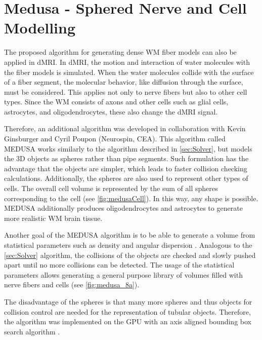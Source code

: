 \section{Medusa - Sphered Nerve and Cell Modelling}
\label{sec:medusa}
%
The proposed algorithm for generating dense \ac{WM} fiber models can also be applied in \ac{dMRI}.
In \ac{dMRI}, the motion and interaction of water molecules with the fiber models is simulated.
When the water molecules collide with the surface of a fiber segment, the molecular behavior, like diffusion through the surface, must be considered.
This applies not only to nerve fibers but also to other cell types.
Since the WM consists of axons and other cells such as glial cells, astrocytes, and oligodendrocytes, these also change the \ac{dMRI} signal.
\par
% 
Therefore, an additional algorithm was developed in collaboration with Kevin Ginsburger and Cyril Poupon (Neurospin, \ac{CEA}).
This algorithm called \ac{MEDUSA} \cite{Ginsburger2019} works similarly to the algorithm described in \cref{sec:Solver}, but models the 3D objects as spheres rather than pipe segments.
Such formulation has the advantage that the objects are simpler,
which leads to faster collision checking calculations.
Additionally, the spheres are also used to represent other types of cells.
The overall cell volume is represented by the sum of all spheres corresponding to the cell (see \cref{fig:medusaCell}).
In this way, any shape is possible.
\ac{MEDUSA} additionally produces oligodendrocytes and astrocytes to generate more realistic \ac{WM} brain tissue.
\par
% 
Another goal of the \ac{MEDUSA} algorithm is to be able to generate a volume from statistical parameters such as density and angular dispersion \cite{Ginsburger2019, ginsburgerDis2019}.
Analogous to the \cref{sec:Solver} algorithm, the collisions of the objects are checked and slowly pushed apart until no more collisions can be detected.
The usage of the statistical parameters allows generating a general purpose library of volumes filled with nerve fibers and cells (see \cref{fig:medusa_8a}).
\par
% 
The disadvantage of the spheres is that many more spheres and thus objects for collision control are needed for the representation of tubular objects.
Therefore, the algorithm was implemented on the \ac{GPU} with an axis aligned bounding box search algorithm \cite{Karras2012}.
% 
% 
%

